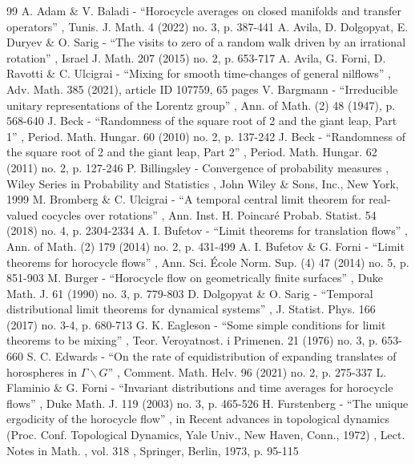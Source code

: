 \documentclass[11pt]{article}
\theoremstyle{definition}
\begin{document}

\begin{thebibliography}{99}
 A. Adam \& V. Baladi - “Horocycle averages on closed manifolds and transfer operators” , Tunis. J. Math. 4 (2022) no. 3, p. 387-441
 A. Avila, D. Dolgopyat, E. Duryev \& O. Sarig - “The visits to zero of a random walk driven by an irrational rotation” , Israel J. Math. 207 (2015) no. 2, p. 653-717
 A. Avila, G. Forni, D. Ravotti \& C. Ulcigrai - “Mixing for smooth time-changes of general nilflows” , Adv. Math. 385 (2021), article ID 107759, 65 pages
 V. Bargmann - “Irreducible unitary representations of the Lorentz group” , Ann. of Math. (2) 48 (1947), p. 568-640
 J. Beck - “Randomness of the square root of 2 and the giant leap, Part 1” , Period. Math. Hungar. 60 (2010) no. 2, p. 137-242
 J. Beck - “Randomness of the square root of 2 and the giant leap, Part 2” , Period. Math. Hungar. 62 (2011) no. 2, p. 127-246
 P. Billingsley - Convergence of probability measures , Wiley Series in Probability and Statistics , John Wiley \& Sons, Inc., New York, 1999
 M. Bromberg \& C. Ulcigrai - “A temporal central limit theorem for real-valued cocycles over rotations” , Ann. Inst. H. Poincaré Probab. Statist. 54 (2018) no. 4, p. 2304-2334
 A. I. Bufetov - “Limit theorems for translation flows” , Ann. of Math. (2) 179 (2014) no. 2, p. 431-499
 A. I. Bufetov \& G. Forni - “Limit theorems for horocycle flows” , Ann. Sci. École Norm. Sup. (4) 47 (2014) no. 5, p. 851-903
 M. Burger - “Horocycle flow on geometrically finite surfaces” , Duke Math. J. 61 (1990) no. 3, p. 779-803
 D. Dolgopyat \& O. Sarig - “Temporal distributional limit theorems for dynamical systems” , J. Statist. Phys. 166 (2017) no. 3-4, p. 680-713
 G. K. Eagleson - “Some simple conditions for limit theorems to be mixing” , Teor. Veroyatnost. i Primenen. 21 (1976) no. 3, p. 653-660
 S. C. Edwards - “On the rate of equidistribution of expanding translates of horospheres in $\Gamma \backslash G$” , Comment. Math. Helv. 96 (2021) no. 2, p. 275-337
 L. Flaminio \& G. Forni - “Invariant distributions and time averages for horocycle flows” , Duke Math. J. 119 (2003) no. 3, p. 465-526
 H. Furstenberg - “The unique ergodicity of the horocycle flow” , in Recent advances in topological dynamics (Proc. Conf. Topological Dynamics, Yale Univ., New Haven, Conn., 1972) , Lect. Notes in Math. , vol. 318 , Springer, Berlin, 1973, p. 95-115

\end{thebibliography}
\end{document}
